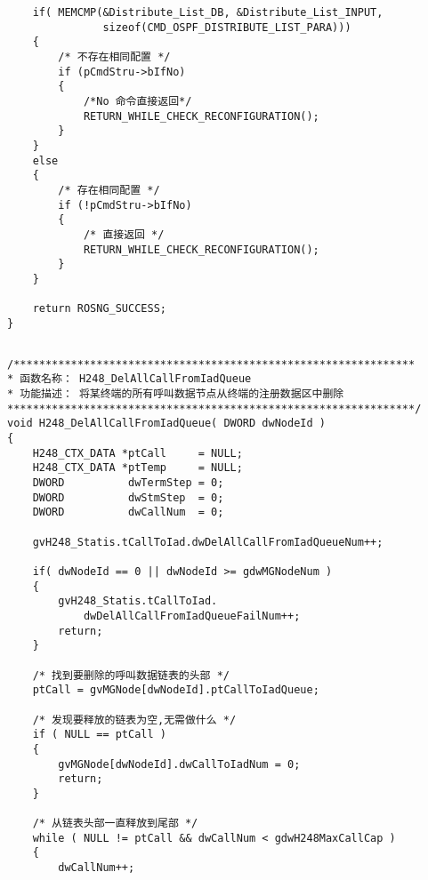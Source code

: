 ﻿\documentclass  [11pt,onecolumn]{article}
\begin{document}
\begin{lstlisting}
    if( MEMCMP(&Distribute_List_DB, &Distribute_List_INPUT, 
               sizeof(CMD_OSPF_DISTRIBUTE_LIST_PARA)))
    {
        /* 不存在相同配置 */
        if (pCmdStru->bIfNo)
        {
            /*No 命令直接返回*/
            RETURN_WHILE_CHECK_RECONFIGURATION();
        }
    }
    else
    {
        /* 存在相同配置 */
        if (!pCmdStru->bIfNo)
        {
            /* 直接返回 */
            RETURN_WHILE_CHECK_RECONFIGURATION();
        }
    }

    return ROSNG_SUCCESS;
}
\end{lstlisting}



\subsection{}
\begin{lstlisting}
/***************************************************************
* 函数名称： H248_DelAllCallFromIadQueue
* 功能描述： 将某终端的所有呼叫数据节点从终端的注册数据区中删除
****************************************************************/
void H248_DelAllCallFromIadQueue( DWORD dwNodeId )
{
    H248_CTX_DATA *ptCall     = NULL;
    H248_CTX_DATA *ptTemp     = NULL;
    DWORD          dwTermStep = 0;
    DWORD          dwStmStep  = 0;
    DWORD          dwCallNum  = 0;
    
    gvH248_Statis.tCallToIad.dwDelAllCallFromIadQueueNum++;

    if( dwNodeId == 0 || dwNodeId >= gdwMGNodeNum )
    {
        gvH248_Statis.tCallToIad.
            dwDelAllCallFromIadQueueFailNum++;
        return;
    }

    /* 找到要删除的呼叫数据链表的头部 */
    ptCall = gvMGNode[dwNodeId].ptCallToIadQueue;

    /* 发现要释放的链表为空,无需做什么 */
    if ( NULL == ptCall )
    {
        gvMGNode[dwNodeId].dwCallToIadNum = 0;
        return;
    }

    /* 从链表头部一直释放到尾部 */
    while ( NULL != ptCall && dwCallNum < gdwH248MaxCallCap )
    {
        dwCallNum++;
        

\end{lstlisting}
\end{document}
